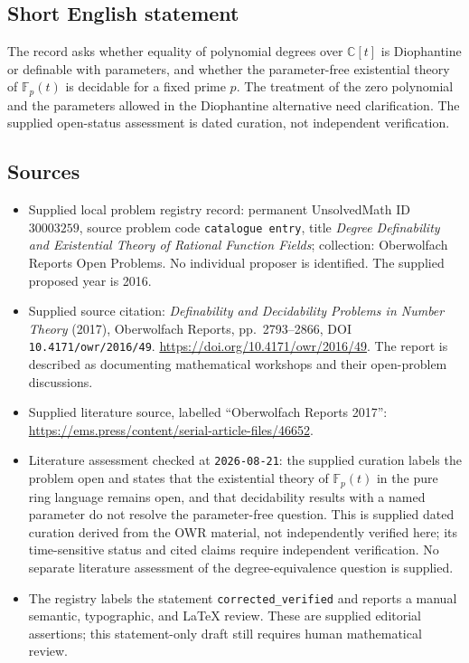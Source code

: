 \documentclass[11pt]{article}
\newcommand{\C}{\mathbb{C}}
\newcommand{\F}{\mathbb{F}}
\begin{document}
\subsection{Short English statement}
The record asks whether equality of polynomial degrees over \(\C[t]\) is Diophantine or definable with parameters, and whether the parameter-free existential theory of \(\F_p(t)\) is decidable for a fixed prime \(p\). The treatment of the zero polynomial and the parameters allowed in the Diophantine alternative need clarification. The supplied open-status assessment is dated curation, not independent verification.
\subsection{Sources}
\begin{itemize}
\item Supplied local problem registry record: permanent UnsolvedMath ID \(30003259\), source problem code \texttt{catalogue entry}, title \emph{Degree Definability and Existential Theory of Rational Function Fields}; collection: Oberwolfach Reports Open Problems. No individual proposer is identified. The supplied proposed year is 2016.
\item Supplied source citation: \emph{Definability and Decidability Problems in Number Theory} (2017), Oberwolfach Reports, pp.\ 2793--2866, DOI \texttt{10.4171/owr/2016/49}. \url{https://doi.org/10.4171/owr/2016/49}. The report is described as documenting mathematical workshops and their open-problem discussions.
\item Supplied literature source, labelled ``Oberwolfach Reports 2017'': \url{https://ems.press/content/serial-article-files/46652}.
\item Literature assessment checked at \texttt{2026-08-21}: the supplied curation labels the problem open and states that the existential theory of \(\F_p(t)\) in the pure ring language remains open, and that decidability results with a named parameter do not resolve the parameter-free question. This is supplied dated curation derived from the OWR material, not independently verified here; its time-sensitive status and cited claims require independent verification. No separate literature assessment of the degree-equivalence question is supplied.
\item The registry labels the statement \texttt{corrected\_verified} and reports a manual semantic, typographic, and LaTeX review. These are supplied editorial assertions; this statement-only draft still requires human mathematical review.
\end{itemize}
\end{document}
